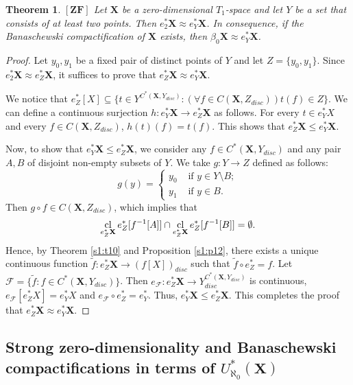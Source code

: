 \documentclass[12pt,twoside,leqno]{article}
\theoremstyle{plain}
\newtheorem{theorem}{Theorem}[section]
\theoremstyle{definition}
\theoremstyle{remark}
\DeclareMathOperator{\cl}{{\rm cl}}
\begin{document}
\begin{theorem}
	\label{s2:t10}
	$[\mathbf{ZF}]$
	Let $\mathbf{X}$ be a zero-dimensional $T_1$-space and let $Y$ be a set that consists of at least two points. Then $e^{\ast}_2\mathbf{X}\approx e^{\ast}_Y\mathbf{X}$. In consequence, if the Banaschewski compactification of $\mathbf{X}$ exists, then $\beta_0\mathbf{X}\approx e^{\ast}_Y\mathbf{X}$.
\end{theorem}
\begin{proof}
	Let $y_0, y_1$ be a fixed pair of distinct points of $Y$ and let $Z=\{ y_0, y_1\}$. Since $e^{\ast}_2\mathbf{X}\approx e^{\ast}_Z\mathbf{X}$, it suffices to prove that $e^{\ast}_Z\mathbf{X}\approx e^{\ast}_Y\mathbf{X}$.
	
	We notice that $e^{\ast}_Z[X]\subseteq\{t\in Y^{C^{\ast}(\mathbf{X}, Y_{disc})}: (\forall f\in C(\mathbf{X}, Z_{disc})) t(f)\in Z\}$. We can define a continuous surjection $h: e^{\ast}_Y\mathbf{X}\to e^{\ast}_Z\mathbf{X}$ as follows. For every $t\in e_{Y}^{\ast}X$ and every $f\in C(\mathbf{X}, Z_{disc})$, $h(t)(f)= t(f)$. This shows that $e^{\ast}_Z\mathbf{X}\leq e^{\ast}_Y\mathbf{X}$.  
	
	Now, to show that $e^{\ast}_Y\mathbf{X}\leq e^{\ast}_Z\mathbf{X}$, we consider any $f\in C^{\ast}(\mathbf{X}, Y_{disc})$ and any pair $A,B$ of disjoint non-empty subsets of $Y$. We take $g: Y\to Z$ defined as follows: 
	$$
	g(y)=\begin{cases} y_0 &\text{ if } y\in Y\setminus B;\\
		y_1 &\text{ if } y\in B.\end{cases}
	$$
	\noindent Then $g\circ f\in C(\mathbf{X}, Z_{disc})$, which implies that 
	$$\cl_{e^{\ast}_Z\mathbf{X}}e^{\ast}_Z[f^{-1}[A]]\cap \cl_{e^{\ast}_Z\mathbf{X}}e^{\ast}_Z[f^{-1}[B]]=\emptyset.$$
	Hence, by Theorem \ref{s1:t10} and Proposition \ref{s1:p12}, there exists a unique continuous function $\tilde{f}:e^{\ast}_Z\mathbf{X}\rightarrow (f[X])_{disc}$ such that $\tilde{f}\circ e^{\ast}_Z=f$. Let $\mathcal{F}=\{\tilde{f}: f\in C^{\ast}(\mathbf{X}, Y_{disc})\}$. Then $e_{\mathcal{F}}: e^{\ast}_Z\mathbf{X}\to Y_{disc}^{C^{\ast}(\mathbf{X}, Y_{disc})}$ is continuous, $e_{\mathcal{F}}[e^{\ast}_{Z}X]=e^{\ast}_{Y}X$ and $e_{\mathcal{F}}\circ e^{\ast}_Z=e^{\ast}_Y$. Thus, $e^{\ast}_{Y}\mathbf{X}\leq e^{\ast}_{Z}\mathbf{X}$. This completes the proof that $e^{\ast}_Z\mathbf{X}\approx e^{\ast}_Y\mathbf{X}$. 
\end{proof}

\subsection{Strong zero-dimensionality and Banaschewski compactifications in terms of $U_{\aleph_0}^{\ast}(\mathbf{X})$}
\label{s2.2}
\end{document}
